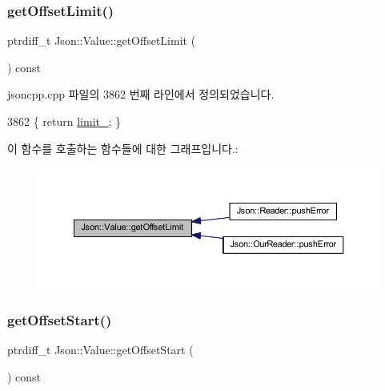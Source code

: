 \mbox{\label{class_json_1_1_value_a2cdfa01935f87fcace90d450cbd2c0a4}} 
\subsubsection{\texorpdfstring{get\+Offset\+Limit()}{getOffsetLimit()}}
{\footnotesize\ttfamily ptrdiff\+\_\+t Json\+::\+Value\+::get\+Offset\+Limit (\begin{DoxyParamCaption}{ }\end{DoxyParamCaption}) const}



jsoncpp.\+cpp 파일의 3862 번째 라인에서 정의되었습니다.


\begin{DoxyCode}
3862 \{ \textcolor{keywordflow}{return} \hyperlink{class_json_1_1_value_afe377e25f6d3b5b8ea7221c84f29412a}{limit\_}; \}
\end{DoxyCode}
이 함수를 호출하는 함수들에 대한 그래프입니다.\+:\nopagebreak
\begin{figure}[H]
\begin{center}
\leavevmode
\includegraphics[width=350pt]{class_json_1_1_value_a2cdfa01935f87fcace90d450cbd2c0a4_icgraph}
\end{center}
\end{figure}
\mbox{\label{class_json_1_1_value_afa081dc764000951a1d8d6148155508e}} 
\subsubsection{\texorpdfstring{get\+Offset\+Start()}{getOffsetStart()}}
{\footnotesize\ttfamily ptrdiff\+\_\+t Json\+::\+Value\+::get\+Offset\+Start (\begin{DoxyParamCaption}{ }\end{DoxyParamCaption}) const}



